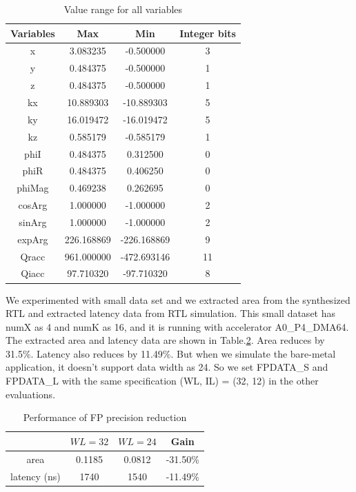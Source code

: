 \begin{table}[ht!]
    \centering
    \begin{tabular}{c|c|c|c}
    \hline \hline
   Variables &       Max&    Min& Integer bits\\
   \hline \hline
 x&     3.083235        &-0.500000& 3 \\
 y&     0.484375        &-0.500000& 1 \\
 z&     0.484375        &-0.500000& 1 \\
 kx&    10.889303       &-10.889303& 5 \\
 ky&    16.019472       &-16.019472& 5 \\
 kz&    0.585179        &-0.585179& 1\\
 phiI   &0.484375       &0.312500& 0 \\
 phiR   &0.484375       &0.406250& 0 \\
 phiMag &0.469238       &0.262695& 0 \\
 cosArg&        1.000000        &-1.000000& 2\\
 sinArg &1.000000       &-1.000000& 2 \\
 \hline
 expArg &226.168869     &-226.168869& 9 \\
 Qracc  &961.000000     &-472.693146& 11 \\
 Qiacc  &97.710320      &-97.710320& 8 \\
\hline \hline
    \end{tabular}
    \caption{Value range for all variables}
    \label{tab-8}
\end{table}

We experimented with small data set and we extracted area from the synthesized
RTL and extracted latency data from RTL simulation. This small dataset has numX
as 4 and numK as 16, and it is running with accelerator A0\_P4\_DMA64. The
extracted area and latency data are shown in Table.\ref{tab-3}. Area reduces by
31.5\%. Latency also reduces by 11.49\%. But when we simulate the bare-metal
application, it doesn't support data width as 24. So we set FPDATA\_S and
FPDATA\_L with the same specification (WL, IL) = (32, 12) in the other
evaluations.  \\

\begin{table}[h!]
    \centering
    \begin{tabular}{c|c|c|c}
    \hline
        & $WL=32$ & $WL=24$ &  Gain \\
        \hline
   area &  0.1185  & 0.0812   & -31.50\% \\ 
latency (ns) &  1740 &  1540  & -11.49\% \\
    \hline
    \end{tabular}
    \caption{Performance of FP precision reduction}
    \label{tab-3}
\end{table}

